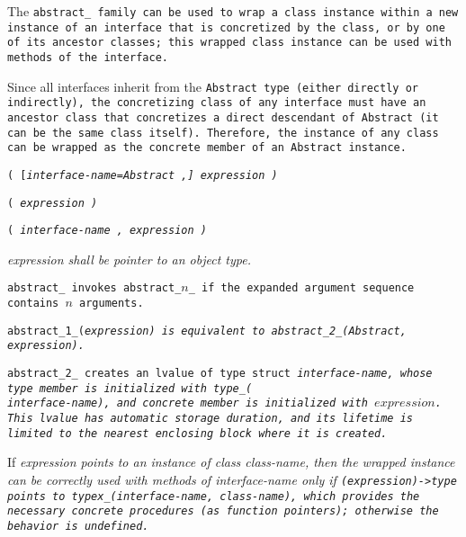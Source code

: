 The \tt{abstract_} family can be used to wrap a class
instance within a new instance of an interface that is
concretized by the class, or by one of its ancestor classes;
this wrapped class instance can be used with methods of the interface.

\note Since all interfaces inherit from the \tt{Abstract} type
(either directly or indirectly), the concretizing class of any
interface must have an ancestor class that concretizes a direct
descendant of \tt{Abstract} (it can be the same class itself).
Therefore, the instance of any class can be wrapped as
the \tt{concrete} member of an \tt{Abstract} instance.


\s\s\s\tt{(} [\it{interface-name}\tt{=Abstract} \tt{,}] \it{expression} \tt{)}

\s\tt{(} \it{expression} \tt{)}

\s\tt{(} \phantom{[}\it{interface-name} \tt{,}\phantom{]} \it{expression} \tt{)}


\it{expression} shall be pointer to an object type.


\tt{abstract_} invokes \tt{abstract_}$n$\_ if the
expanded argument sequence contains  $n$ arguments.

\tt{abstract_1_(}\it{expression}\tt{)} is equivalent to
\tt{abstract_2_(Abstract,} \it{expression}\tt{)}.

\tt{abstract_2_} creates an lvalue of type \tt{struct} \it{interface-name},
whose \tt{type} member is initialized with \tt{type_(}\\\it{interface-name}\tt{)},
and \tt{concrete} member is initialized with $expression$.
This lvalue has automatic storage duration, and its lifetime
is limited to the nearest enclosing block where it is created.

\note If \it{expression} points to an instance of class \it{class-name},
then the wrapped instance can be correctly used with methods of
\it{interface-name} only if \tt{(}\it{expression}\tt{)->type} points to
\tt{typex_(}\it{interface-name}\tt{,} \it{class-name}\tt{)},
which provides the necessary concrete procedures (as function pointers);
otherwise the behavior is undefined.
